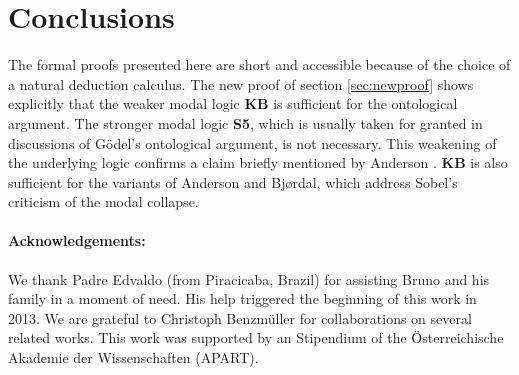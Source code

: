 \documentclass[smallextended]{svjour3}
\begin{document}

\section{Conclusions}

The formal proofs presented here are short and accessible because of the choice of a natural deduction calculus. The new proof of section \ref{sec:newproof} shows explicitly that the weaker modal logic {\bf KB} is sufficient for the ontological argument. The stronger modal logic {\bf S5}, which is usually taken for granted in discussions of G\"odel's ontological argument, is not necessary. This weakening of the underlying logic confirms a claim briefly mentioned by Anderson \citep[footnote 2]{and90}. {\bf KB} is also sufficient for the variants of Anderson and Bj{\o}rdal, which address Sobel's criticism of the modal collapse.

\paragraph{Acknowledgements:} We thank Padre Edvaldo (from Piracicaba, Brazil) for assisting Bruno and his family in a moment of need. His help triggered the beginning of this work in 2013. We are grateful to Christoph Benzm\"uller for collaborations on several related works. This work was supported by an Stipendium of the \"Osterreichische Akademie der Wissenschaften (APART). 
\end{document}
